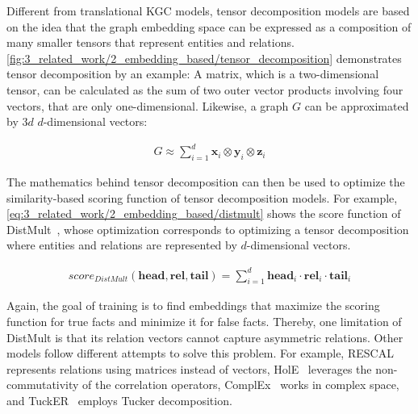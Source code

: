 Different from translational KGC models, tensor decomposition models are based on the idea that the graph embedding space can be expressed as a composition of many smaller tensors that represent entities and relations. \autoref{fig:3_related_work/2_embedding_based/tensor_decomposition} demonstrates tensor decomposition by an example: A matrix, which is a two-dimensional tensor, can be calculated as the sum of two outer vector products involving four vectors, that are only one-dimensional. Likewise, a graph $G$ can be approximated by $3d$ $d$-dimensional vectors:

\begin{align}
    G \approx \sum_{i=1}^{d} \textbf{x}_i \otimes \textbf{y}_i \otimes \textbf{z}_i
    \label{eq:3_related_work/2_embedding_based/tensor_decomposition}
\end{align}

The mathematics behind tensor decomposition can then be used to optimize the similarity-based scoring function of tensor decomposition models. For example, \autoref{eq:3_related_work/2_embedding_based/distmult} shows the score function of DistMult~\cite{Yang2015EmbeddingEA}, whose optimization corresponds to optimizing a tensor decomposition where entities and relations are represented by $d$-dimensional vectors.

\begin{align}
    score_{DistMult}(\textbf{head}, \textbf{rel}, \textbf{tail}) = \sum_{i=1}^{d} \textbf{head}_i \cdot \textbf{rel}_i \cdot \textbf{tail}_i
    \label{eq:3_related_work/2_embedding_based/distmult}
\end{align}

Again, the goal of training is to find embeddings that maximize the scoring function for true facts and minimize it for false facts. Thereby, one limitation of DistMult is that its relation vectors cannot capture asymmetric relations. Other models follow different attempts to solve this problem. For example, RESCAL~\cite{Nickel2013TensorFF} represents relations using matrices instead of vectors, HolE~\cite{Nickel2016HolographicEO} leverages the non-commutativity of the correlation operators, ComplEx~\cite{Trouillon2016ComplexEF} works in complex space, and TuckER~\cite{Balazevic2019TuckERTF} employs Tucker decomposition.

